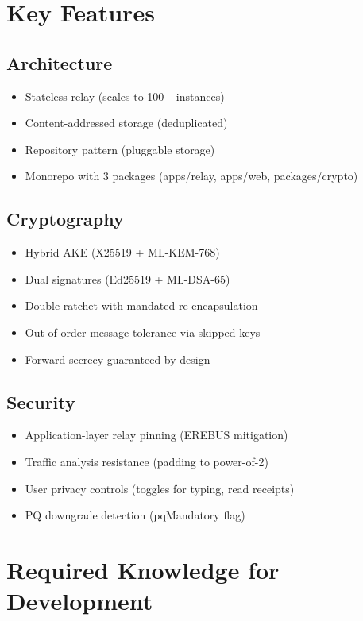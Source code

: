 \documentclass[11pt,a4paper,oneside]{book}
\begin{document}
\vspace{-0.3cm}\section{Key Features}
\vspace{-0.2cm}\subsection{Architecture}
\begin{itemize}
  \item Stateless relay (scales to 100+ instances)
  \item Content-addressed storage (deduplicated)
  \item Repository pattern (pluggable storage)
  \item Monorepo with 3 packages (apps/relay, apps/web, packages/crypto)
\end{itemize}
\vspace{-0.2cm}\subsection{Cryptography}
\begin{itemize}
  \item Hybrid AKE (X25519 + ML-KEM-768)
  \item Dual signatures (Ed25519 + ML-DSA-65)
  \item Double ratchet with mandated re-encapsulation
  \item Out-of-order message tolerance via skipped keys
  \item Forward secrecy guaranteed by design
\end{itemize}
\vspace{-0.2cm}\subsection{Security}
\begin{itemize}
  \item Application-layer relay pinning (EREBUS mitigation)
  \item Traffic analysis resistance (padding to power-of-2)
  \item User privacy controls (toggles for typing, read receipts)
  \item PQ downgrade detection (pqMandatory flag)
\end{itemize}
\vspace{-0.3cm}\section{Required Knowledge for Development}
\end{document}
